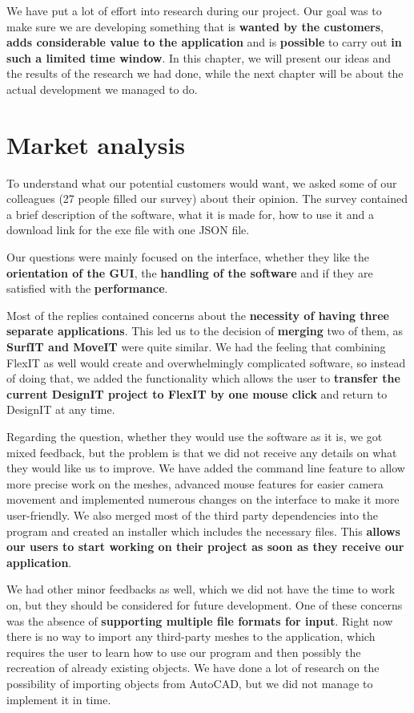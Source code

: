 \documentclass[a4paper, 11pt, article]{report}
\begin{document}
We have put a lot of effort into research during our project. Our goal was to make sure we are developing something that is \textbf{wanted by the customers}, \textbf{adds considerable value to the application} and is \textbf{possible} to carry out \textbf{in such a limited time window}. In this chapter, we will present our ideas and the results of the research we had done, while the next chapter will be about the actual development we managed to do.

\section{Market analysis}

To understand what our potential customers would want, we asked some of our colleagues (27 people filled our survey) about their opinion. The survey contained a brief description of the software, what it is made for, how to use it and a download link for the exe file with one JSON file.

Our questions were mainly focused on the interface, whether they like the \textbf{orientation of the GUI}, the \textbf{handling of the software} and if they are satisfied with the \textbf{performance}.

Most of the replies contained concerns about the \textbf{necessity of having three separate applications}. This led us to the decision of \textbf{merging} two of them, as \textbf{SurfIT and MoveIT} were quite similar. We had the feeling that combining FlexIT as well would create and overwhelmingly complicated software, so instead of doing that, we added the functionality which allows the user to \textbf{transfer the current DesignIT project to FlexIT by one mouse click} and return to DesignIT at any time.

Regarding the question, whether they would use the software as it is, we got mixed feedback, but the problem is that we did not receive any details on what they would like us to improve. We have added the command line feature to allow more precise work on the meshes, advanced mouse features for easier camera movement and implemented numerous changes on the interface to make it more user-friendly. We also merged most of the third party dependencies into the program and created an installer which includes the necessary files. This \textbf{allows our users to start working on their project as soon as they receive our application}.

We had other minor feedbacks as well, which we did not have the time to work on, but they should be considered for future development. One of these concerns was the absence of \textbf{supporting multiple file formats for input}. Right now there is no way to import any third-party meshes to the application, which requires the user to learn how to use our program and then possibly the recreation of already existing objects. We have done a lot of research on the possibility of importing objects from AutoCAD, but we did not manage to implement it in time.
\end{document}
